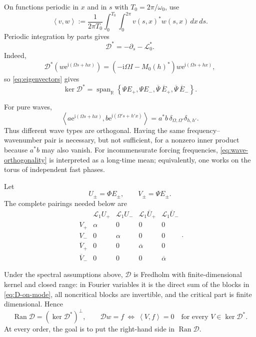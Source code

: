 \documentclass[11pt]{article}
\newcommand{\ii}{\mathrm{i}}
\newcommand{\ee}{\mathrm{e}}
\newcommand{\cL}{\mathcal{L}}
\newcommand{\cD}{\mathcal{D}}
\newcommand{\ip}[2]{\left\langle #1,#2\right\rangle}
\DeclareMathOperator{\spanop}{span}
\begin{document}
On functions periodic in $x$ and in $s$ with
$T_0=2\pi/\omega_0$, use
\begin{equation}
 \ip{v}{w}:=\frac{1}{2\pi T_0}
 \int_0^{T_0}\int_0^{2\pi}v(s,x)^*w(s,x)\,dx\,ds.
 \label{eq:inner-product}
\end{equation}
Periodic integration by parts gives
\begin{equation}
 \cD^*=-\partial_s-\cL_0^*.
 \label{eq:D-star}
\end{equation}
Indeed,
\begin{equation}
 \cD^*\left(w\ee^{\ii(\Omega s+hx)}\right)
 =\left(-\ii\Omega I-M_0(h)^*\right)w
 \ee^{\ii(\Omega s+hx)},
 \label{eq:Dstar-on-mode}
\end{equation}
so \eqref{eq:eigenvectors} gives
\begin{equation}
 \ker\cD^*=\spanop_{\mathbb R}\left\{
 \Psi E_+,\Psi E_-,\overline\Psi\,\overline E_+,
 \overline\Psi\,\overline E_-
 \right\}.
 \label{eq:D-adjoint}
\end{equation}

For pure waves,
\begin{equation}
 \ip{a\ee^{\ii(\Omega s+hx)}}
 {b\ee^{\ii(\Omega' s+h'x)}}
 =a^*b\,\delta_{\Omega,\Omega'}\delta_{h,h'}.
 \label{eq:wave-orthogonality}
\end{equation}
Thus different wave types are orthogonal.  Having the same
frequency--wavenumber pair is necessary, but not sufficient, for a nonzero
inner product because $a^*b$ may also vanish.  For incommensurate forcing
frequencies, \eqref{eq:wave-orthogonality} is interpreted as a long-time mean;
equivalently, one works on the torus of independent fast phases.

Let
\begin{equation}
 U_\pm=\Phi E_\pm,
 \qquad V_\pm=\Psi E_\pm.
\end{equation}
The complete pairings needed below are
\begin{equation}
\begin{array}{c|cccc}
 &\cL_1U_+&\cL_1U_-&\cL_1\overline U_+&\cL_1\overline U_-\\ \hline
 V_+&\alpha&0&0&0\\
 V_-&0&\alpha&0&0\\
 \overline V_+&0&0&\overline\alpha&0\\
 \overline V_-&0&0&0&\overline\alpha
\end{array}.
 \label{eq:L1-pairing-table}
\end{equation}

Under the spectral assumptions above, $\cD$ is Fredholm with
finite-dimensional kernel and closed range: in Fourier variables it is the
direct sum of the blocks in \eqref{eq:D-on-mode}, all noncritical blocks are
invertible, and the critical part is finite dimensional.  Hence
\begin{equation}
 \operatorname{Ran}\cD=(\ker\cD^*)^\perp,
 \qquad
 \cD w=f\ \Longleftrightarrow\
 \ip{V}{f}=0\quad\text{for every }V\in\ker\cD^*.
 \label{eq:fredholm}
\end{equation}
At every order, the goal is to put the right-hand side in
$\operatorname{Ran}\cD$.
\end{document}
